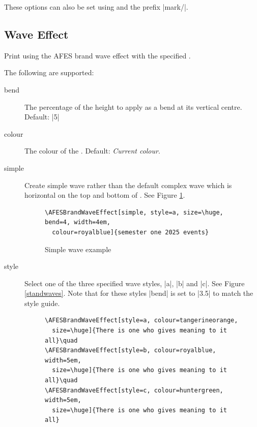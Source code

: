 \documentclass[a4paper]{l3doc}
\begin{document}
These options can also be set using  and the prefix
|mark/|.

\subsection{Wave Effect}

\begin{function}{\AFESBrandWaveEffect}
  \begin{syntax}
  \end{syntax}
  Print  using the AFES brand wave effect with the specified
  .
\end{function}

The following  are supported:

\begin{description}
  \item[bend] The percentage of the  height to apply as a bend at
    its vertical centre. Default: |5|
  \item[colour] The colour of the . Default: \emph{Current colour}.
  \item[simple] Create simple wave rather than the default complex wave which
    is horizontal on the top and bottom of . See Figure
    \ref{simplewave}.

    \begin{figure}
      \begin{lstlisting}
\AFESBrandWaveEffect[simple, style=a, size=\huge, bend=4, width=4em,
  colour=royalblue]{semester one 2025 events}
      \end{lstlisting}

      \centering
      \caption{Simple wave example}\label{simplewave}
    \end{figure}

  \item[style] Select one of the three specified wave styles, |a|, |b| and
    |c|. See Figure \ref{standwaves}. Note that for these styles |bend| is set
    to |3.5| to match the style guide.

    \begin{figure}
      \begin{lstlisting}
\AFESBrandWaveEffect[style=a, colour=tangerineorange,
  size=\huge]{There is one who gives meaning to it all}\quad
\AFESBrandWaveEffect[style=b, colour=royalblue, width=5em,
  size=\huge]{There is one who gives meaning to it all}\quad
\AFESBrandWaveEffect[style=c, colour=huntergreen, width=5em,
  size=\huge]{There is one who gives meaning to it all}
    \end{lstlisting}


\end{figure}
\end{description}
\end{document}
